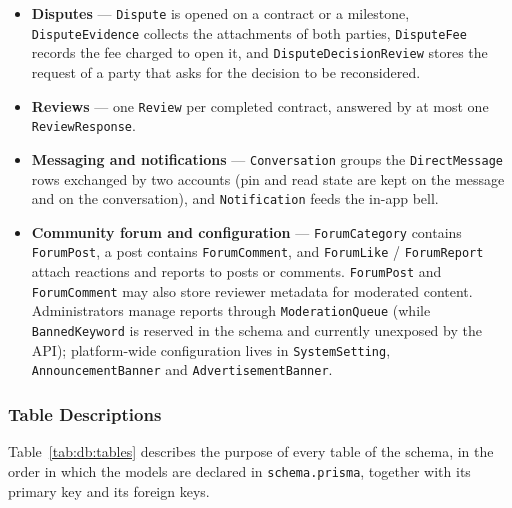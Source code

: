 \begin{itemize}[leftmargin=*]
    \item \textbf{Disputes} --- \texttt{Dispute} is opened on a contract or a milestone, \texttt{DisputeEvidence} collects the attachments of both parties, \texttt{DisputeFee} records the fee charged to open it, and \texttt{DisputeDecisionReview} stores the request of a party that asks for the decision to be reconsidered.
    \item \textbf{Reviews} --- one \texttt{Review} per completed contract, answered by at most one \texttt{ReviewResponse}.
    \item \textbf{Messaging and notifications} --- \texttt{Conversation} groups the \texttt{DirectMessage} rows exchanged by two accounts (pin and read state are kept on the message and on the conversation), and \texttt{Notification} feeds the in-app bell.
    \item \textbf{Community forum and configuration} --- \texttt{ForumCategory} contains \texttt{ForumPost}, a post contains \texttt{ForumComment}, and \texttt{ForumLike} / \texttt{ForumReport} attach reactions and reports to posts or comments. \texttt{ForumPost} and \texttt{ForumComment} may also store reviewer metadata for moderated content. Administrators manage reports through \texttt{ModerationQueue} (while \texttt{BannedKeyword} is reserved in the schema and currently unexposed by the API); platform-wide configuration lives in \texttt{SystemSetting}, \texttt{AnnouncementBanner} and \texttt{AdvertisementBanner}.
\end{itemize}

\subsubsection*{Table Descriptions}

Table~\ref{tab:db:tables} describes the purpose of every table of the schema, in the
order in which the models are declared in \texttt{schema.prisma}, together with its
primary key and its foreign keys.


